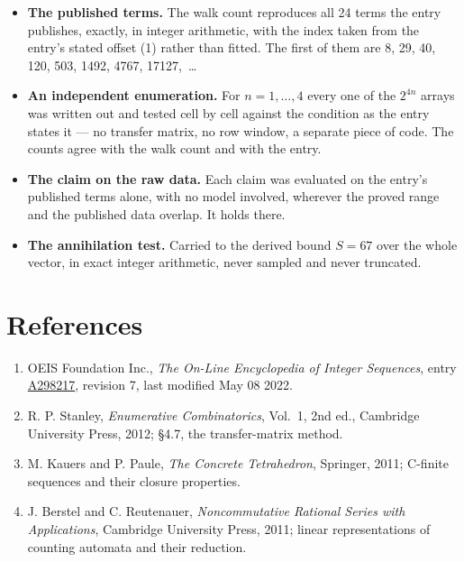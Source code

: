 \documentclass[11pt]{article}
\theoremstyle{definition}
\begin{document}
\begin{itemize}

\item {\bfseries The published terms.} The walk count reproduces all 24 terms the entry publishes, exactly, in integer arithmetic, with the index taken from the entry's stated offset (1) rather than fitted. The first of them are 8, 29, 40, 120, 503, 1492, 4767, 17127,~\dots

\item {\bfseries An independent enumeration.} For $n = 1,\dots,4$ every one of the $2^{4n}$ arrays was written out and tested cell by cell against the condition as the entry states it --- no transfer matrix, no row window, a separate piece of code. The counts agree with the walk count and with the entry.

\item {\bfseries The claim on the raw data.} Each claim was evaluated on the entry's published terms alone, with no model involved, wherever the proved range and the published data overlap. It holds there.

\item {\bfseries The annihilation test.} Carried to the derived bound $S = 67$ over the whole vector, in exact integer arithmetic, never sampled and never truncated.

\end{itemize}

\section{References}

\begin{enumerate}

\item OEIS Foundation Inc., \emph{The On-Line Encyclopedia of Integer Sequences}, entry \href{https://oeis.org/A298217}{A298217}, revision 7, last modified May 08 2022.

\item R. P. Stanley, \emph{Enumerative Combinatorics}, Vol.~1, 2nd ed., Cambridge University Press, 2012; \S4.7, the transfer-matrix method.

\item M. Kauers and P. Paule, \emph{The Concrete Tetrahedron}, Springer, 2011; C-finite sequences and their closure properties.

\item J. Berstel and C. Reutenauer, \emph{Noncommutative Rational Series with Applications}, Cambridge University Press, 2011; linear representations of counting automata and their reduction.

\end{enumerate}
\end{document}
